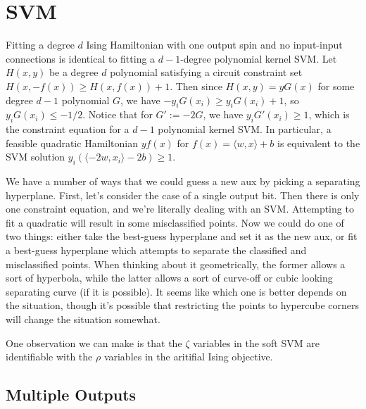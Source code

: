 \documentclass{article}
\begin{document}
\section{SVM}

Fitting a degree $d$ Ising Hamiltonian with one output spin and no input-input connections is identical to fitting a $d-1$-degree polynomial kernel SVM. Let $H(x, y)$ be a degree $d$ polynomial satisfying a circuit constraint set $H(x, -f(x)) \geq H(x, f(x)) + 1$. Then since $H(x,y) = yG(x)$ for some degree $d-1$ polynomial $G$, we have $-y_i G(x_i) \geq y_i G(x_i) + 1$, so $y_i G(x_i) \leq -1/2$. Notice that for $G' := -2G$, we have $y_i G'(x_i) \geq 1$, which is the constraint equation for a $d-1$ polynomial kernel SVM. In particular, a feasible quadratic Hamiltonian $yf(x)$ for $f(x) = \langle w, x \rangle + b$ is equivalent to the SVM solution $y_i(\langle -2w, x_i \rangle - 2b) \geq 1$.

We have a number of ways that we could guess a new aux by picking a separating hyperplane. First, let's consider the case of a single output bit. Then there is only one constraint equation, and we're literally dealing with an SVM. Attempting to fit a quadratic will result in some misclassified points. Now we could do one of two things: either take the best-guess hyperplane and set it as the new aux, or fit a best-guess hyperplane which attempts to separate the classified and misclassified points. When thinking about it geometrically, the former allows a sort of hyperbola, while the latter allows a sort of curve-off or cubic looking separating curve (if it is possible). It seems like which one is better depends on the situation, though it's possible that restricting the points to hypercube corners will change the situation somewhat.

One observation we can make is that the $\zeta$ variables in the soft SVM are identifiable with the $\rho$ variables in the aritifial Ising objective. 

\subsection{Multiple Outputs}
\end{document}

